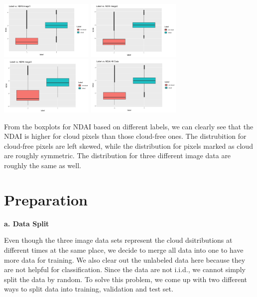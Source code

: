 \documentclass[11pt]{article}
\begin{document}
\includegraphics[width = 4.5cm]{1(c)image12.png}
\includegraphics[width = 4.5cm]{1(c)image13.png}
\includegraphics[width = 4.5cm]{1(c)image14.png}
\includegraphics[width = 4.5cm]{1(c)image15.png}

From the boxplots for NDAI based on different labels, we can clearly see that the NDAI is higher for cloud pixels than those cloud-free ones. The distrubition for cloud-free pixels are left skewed, while the distribution for pixels marked as cloud are roughly symmetric. The distribution for three different image data are roughly the same as well.

\section{Preparation}

\vspace{0.2cm}
\textbf{a. Data Split}

Even though the three image data sets represent the cloud dsitributions at different times at the same place, we decide to merge all data into one to have more data for training. We also clear out the unlabeled data here because they are not helpful for classification. Since the data are not i.i.d., we cannot simply split the data by random. To solve this problem, we come up with two different ways to split data into training, validation and test set.
\end{document}
